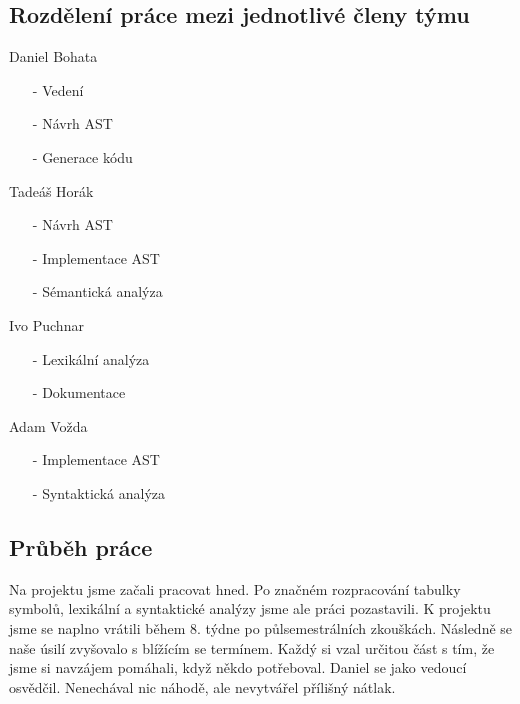 \documentclass[a4paper, 12pt]{article}
\begin{document}
\subsection{Rozdělení práce mezi jednotlivé členy týmu}
\begin{itemize}
    \begin{minipage}{0.5\linewidth}   
        \item Daniel Bohata
        \begin{itemize}
        \item[-] Vedení
        \item[-] Návrh AST
        \item[-] Generace kódu 
        \end{itemize}
        \item Tadeáš Horák
        \begin{itemize}
        \item[-] Návrh AST
        \item[-] Implementace AST
        \item[-] Sémantická analýza
        \end{itemize}
        \item Ivo Puchnar
        \begin{itemize}
        \item[-] Lexikální analýza
        \item[-] Dokumentace
        \end{itemize}
        \item Adam Vožda
        \begin{itemize}
        \item[-] Implementace AST
        \item[-] Syntaktická analýza
        \end{itemize}
    \end{minipage}
\end{itemize}

\newpage
\subsection{Průběh práce}
Na projektu jsme začali pracovat hned. Po značném rozpracování tabulky symbolů, lexikální a syntaktické analýzy jsme ale práci pozastavili. K projektu jsme se naplno vrátili během 8. týdne po půlsemestrálních zkouškách. Následně se naše úsilí zvyšovalo s blížícím se termínem. Každý si vzal určitou část s tím, že jsme si navzájem pomáhali, když někdo potřeboval. Daniel se jako vedoucí osvědčil. Nenechával nic náhodě, ale nevytvářel přílišný nátlak.
\end{document}
